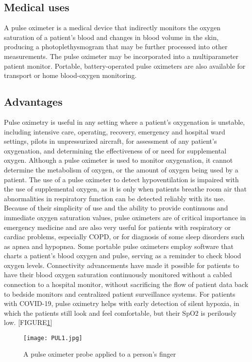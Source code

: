 \documentclass[12pt]{article}
\begin{document}
\subsection{Medical uses}
A pulse oximeter is a medical device that indirectly monitors the oxygen saturation of a patient's blood and changes in blood volume in the skin, producing a photoplethysmogram that may be further processed into other measurements.
The pulse oximeter may be incorporated into a multiparameter patient monitor.
Portable, battery-operated pulse oximeters are also available for transport or home blood-oxygen monitoring.

\subsection{Advantages}

Pulse oximetry is useful in any setting where a patient's oxygenation is unstable, including intensive care, operating, recovery, emergency and hospital ward settings, pilots in unpressurized aircraft, for assessment of any patient's oxygenation, and determining the effectiveness of or need for supplemental oxygen.
Although a pulse oximeter is used to monitor oxygenation, it cannot determine the metabolism of oxygen, or the amount of oxygen being used by a patient.
The use of a pulse oximeter to detect hypoventilation is impaired with the use of supplemental oxygen, as it is only when patients breathe room air that abnormalities in respiratory function can be detected reliably with its use.
Because of their simplicity of use and the ability to provide continuous and immediate oxygen saturation values, pulse oximeters are of critical importance in emergency medicine and are also very useful for patients with respiratory or cardiac problems, especially COPD, or for diagnosis of some sleep disorders such as apnea and hypopnea.
Some portable pulse oximeters employ software that charts a patient's blood oxygen and pulse, serving as a reminder to check blood oxygen levels.
Connectivity advancements have made it possible for patients to have their blood oxygen saturation continuously monitored without a cabled connection to a hospital monitor, without sacrificing the flow of patient data back to bedside monitors and centralized patient surveillance systems.
For patients with COVID-19, pulse oximetry helps with early detection of silent hypoxia, in which the patients still look and feel comfortable, but their SpO2 is perilously low. [FIGURE\ref{fig_PUL1}]

\begin{figure}[h]
\centering
\texttt{[image: PUL1.jpg]}
\caption{A pulse oximeter probe applied to a person's finger}
\label{fig_PUL1}
\end{figure}
\end{document}

